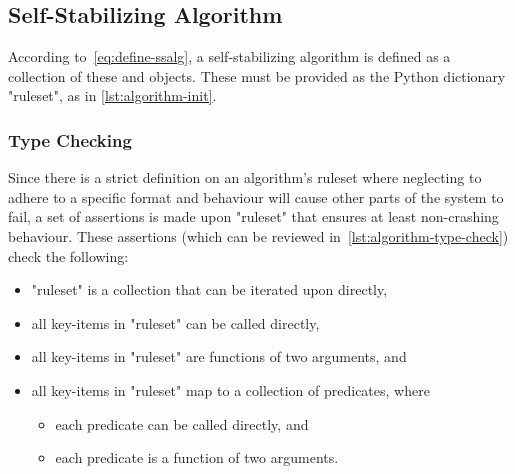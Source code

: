 \subsection{Self-Stabilizing Algorithm}
\label{sec:logic-repr:self-stab-algor}

According to~\eqref{eq:define-ssalg},
  a self-stabilizing algorithm is defined as a collection
  of these  and  objects.
These must be provided as the Python dictionary "ruleset",
  as in \autoref{lst:algorithm-init}.


\subsubsection{Type Checking}
\label{sec:logic-repr:self-stab-algor:type-checking}

Since there is a strict definition on an algorithm's ruleset
  where neglecting to adhere to a specific format and behaviour
  will cause other parts of the system to fail,
  a set of assertions is made upon "ruleset" that ensures at least non-crashing behaviour.
These assertions (which can be reviewed in~\autoref{lst:algorithm-type-check}) check the following:
\begin{itemize}
\item "ruleset" is a collection that can be iterated upon directly,
\item all key-items in "ruleset" can be called directly,
\item all key-items in "ruleset" are functions of two arguments, and
\item all key-items in "ruleset" map to a collection of predicates, where
  \begin{itemize}
  \item each predicate can be called directly, and
  \item each predicate is a function of two arguments.
  \end{itemize}
\end{itemize}


